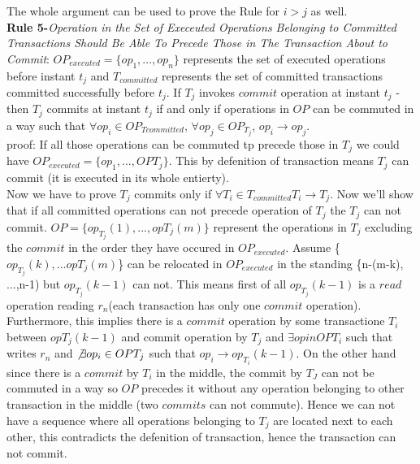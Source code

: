 \documentclass[a4paper, 11pt]{article}
\begin{document}
The whole argument can be used to prove the Rule for $i > j$ as well.\\

\textbf{Rule 5-}\emph{Operation in the Set of Execeuted Operations Belonging to Committed Transactions Should Be Able To Precede Those in The Transaction About to Commit}: $OP_{executed} = \{op_1,..., op_n\}$ represents the set of executed operations before instant $t_j$ and $T_{committed}$ represents the set of committed transactions committed successfully before $t_j$. If $T_j$ invokes ${commit}$ operation at instant $t_j$ - then $T_j$ commits at instant $t_j$ if and only if operations in $OP$ can be commuted in a way such that $\forall op_i \in OP_{T{committed}}$, $\forall op_j \in OP_{T_j}$, $op_i \rightarrow op_j$.\\


proof: If all those operations can be commuted tp precede those in $T_j$ we could have $OP_{executed} = \{op_1,...,OP{T_j}\}$. This by defenition of transaction means $T_j$ can commit (it is executed in its whole entierty).\\

Now we have to prove $T_j$ commits only if $\forall T_i \in T_{committed} T_i \rightarrow T_j$. Now we'll show that if all committed operations can not precede operation of $T_j$ the $T_j$ can not commit. $OP = \{op_{T_j}(1), ..., op{T_j}(m)\}$ represent the operations in $T_j$ excluding the ${commit}$ in the order they have occured in $OP_{executed}$. Assume \{$op_{T_j}(k),...op{T_j}(m)$\} can be relocated in $OP_{executed}$ in the standing \{n-(m-k), ...,n-1) but $op_{T_j}(k-1)$ can not. This means first of all $op_{T_j}(k-1)$ is a ${read}$ operation reading $r_n$(each transaction has only one ${commit}$ operation).\\

Furthermore, this implies there is a ${commit}$ operation by some transactione $T_i$ between $op{T_j}(k-1)$ and commit operation by $T_j$ and $ \exists op in OP{T_i}$ such that writes $r_n$ and $\not \exists op_i \in OP{T_j}$ such that $op_i \rightarrow op_{T_i}(k-1)$. On the other hand since there is a ${commit}$ by $T_i$ in the middle, the commit by $T_J$ can not be commuted in a way so $OP$ precedes it without any operation belonging to other transaction in the middle (two ${commits}$ can not commute). Hence we can not have a sequence where all operations belonging to $T_j$ are located next to each other, this contradicts the defenition of transaction, hence the transaction can not commit.  
\end{document}

